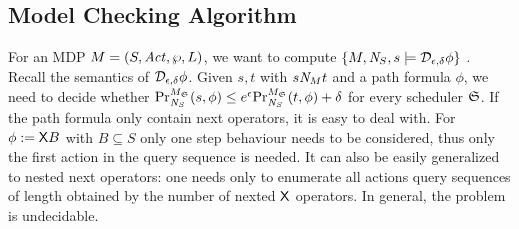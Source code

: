 \subsection{Model Checking Algorithm}
For an MDP $M =
(S, \Act, \wp, L)$, we want to compute $\{ M, \neighbor{S}, s \models
\dpriv{\epsilon}{\delta} \phi \}$ . Recall the semantics of $\dpriv{\epsilon}{\delta}
\phi$. Given $s, t$ with $s \neighbor{M} t$ and a path formula
$\phi$, we need to decide whether
$\myPr{s}{M_{\scheduler{S}}}{\neighbor{S}}{\phi} \leq
e^{\epsilon} \myPr{t}{M_{\scheduler{S}}}{\neighbor{S}}{\phi} + \delta$
for every scheduler $\scheduler{S}$.
If the path formula only contain next operators, it is easy to deal with. For $\phi:=\X B$ with $B\subseteq S$ only one step behaviour needs to be considered, thus only the first action in the query sequence is needed. It can also be easily generalized to nested next operators:  one needs only to enumerate
all actions query sequences of length obtained by the number of nexted $\X$ operators.
In general, the problem is undecidable.


